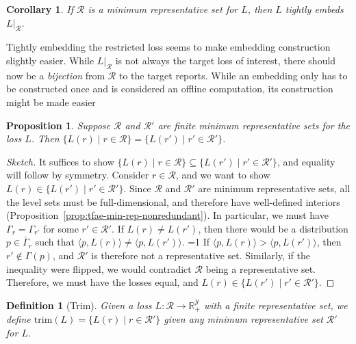 \documentclass[12pt]{article}
\newcommand{\Comments}{1}
\newcommand{\mytodo}[2]{\ifnum\Comments=1%
  \todo[linecolor=#1!80!black,backgroundcolor=#1,bordercolor=#1!80!black]{#2}\fi}
\newcommand{\jessiet}[1]{\mytodo{teal!20!white}{JF: #1}}
\newcommand{\reals}{\mathbb{R}}
\newcommand{\R}{\mathcal{R}}
\newcommand{\Y}{\mathcal{Y}}
\newcommand{\inprod}[2]{\langle #1, #2 \rangle}%
\newcommand{\inter}[1]{\mathring{#1}}%
\newcommand{\trim}{\mathrm{trim}}
\newtheorem{proposition}{Proposition}
\newtheorem{corollary}{Corollary}
\newtheorem{definition}{Definition}
\begin{document}
\begin{corollary}
  If $\R$ is a minimum representative set for $L$, then $L$ tightly embeds $L|_\R$.
\end{corollary}
Tightly embedding the restricted loss seems to make embedding construction slightly easier.
While $L|_\R$ is not always the target loss of interest, there should now be a \emph{bijection} from $\R$ to the target reports.
While an embedding only has to be constructed once and is considered an offline computation, its construction might be made easier 

\begin{proposition}\label{prop:trim-unique}
  Suppose $\R$ and $\R'$ are finite minimum representative sets for the loss $L$.
  Then $\{L(r) \mid r \in \R\} = \{L(r') \mid r' \in \R'\}$.
\end{proposition}
\begin{proof}[Sketch]
  It suffices to show $\{L(r) \mid r \in \R\} \subseteq \{L(r') \mid r' \in \R'\}$, and equality will follow by symmetry.
  Consider $r\in \R$, and we want to show $L(r) \in \{L(r') \mid r' \in \R'\}$.
  Since $\R$ and $\R'$ are minimum representative sets, all the level sets must be full-dimensional, and therefore have well-defined interiors (Proposition~\ref{prop:tfae-min-rep-nonredundant}).
  In particular, we must have $\Gamma_r = \Gamma_{r'}$ for some $r' \in \R'$.
  If $L(r) \neq L(r')$, then there would be a distribution $p \in \inter{\Gamma_r}$ such that $\inprod{p}{L(r)} \neq \inprod{p}{L(r')}$. \jessiet{This needs more detail}
  If $\inprod{p}{L(r)} > \inprod{p}{L(r')}$, then $r' \not \in \Gamma(p)$, and $\R'$ is therefore not a representative set.
  Similarly, if the inequality were flipped, we would contradict $\R$ being a representative set.
  Therefore, we must have the losses equal, and $L(r) \in \{L(r') \mid r' \in \R'\}$.
\end{proof}

\begin{definition}[Trim]\label{def:trim-loss}
  Given a loss $L:\R \to \reals_+^\Y$ with a finite representative set, we define $\trim(L) = \{L(r) \mid r \in \R'\}$ given any minimum representative set $\R'$ for $L$.
\end{definition}
\end{document}
